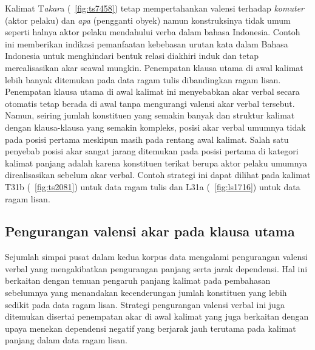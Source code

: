 Kalimat T\textit{akar}a (\pic~\ref{fig:ts7458}) tetap mempertahankan valensi terhadap \textit{komuter} (aktor pelaku) dan \textit{apa} (pengganti obyek) namun konstruksinya tidak umum seperti halnya aktor pelaku mendahului verba dalam bahasa Indonesia. Contoh ini memberikan indikasi pemanfaatan kebebasan urutan kata dalam Bahasa Indonesia untuk menghindari bentuk relasi diakhiri induk dan tetap merealisasikan akar seawal mungkin. Penempatan klausa utama di awal kalimat lebih banyak ditemukan pada data ragam tulis dibandingkan ragam lisan. Penempatan klausa utama di awal kalimat ini menyebabkan akar verbal secara otomatis tetap berada di awal tanpa mengurangi valensi akar verbal tersebut. Namun, seiring jumlah konstituen yang semakin banyak dan struktur kalimat dengan klausa-klausa yang semakin kompleks, posisi akar verbal umumnya tidak pada posisi pertama meskipun masih pada rentang awal kalimat. Salah satu penyebab posisi akar sangat jarang ditemukan pada posisi pertama di kategori kalimat panjang adalah karena konstituen terikat berupa aktor pelaku umumnya direalisasikan sebelum akar verbal. Contoh strategi ini dapat dilihat pada kalimat T31b (\pic~\ref{fig:ts2081}) untuk data ragam tulis dan L31a (\pic~\ref{fig:ls1716}) untuk data ragam lisan.

\subsection{Pengurangan valensi akar pada klausa utama}
Sejumlah simpai pusat dalam kedua korpus data mengalami pengurangan valensi verbal yang mengakibatkan pengurangan panjang serta jarak dependensi. Hal ini berkaitan dengan temuan pengaruh panjang kalimat pada pembahasan sebelumnya yang menandakan kecenderungan jumlah konstituen yang lebih sedikit pada data ragam lisan. Strategi pengurangan valensi verbal ini juga ditemukan disertai penempatan akar di awal kalimat yang juga berkaitan dengan upaya menekan dependensi negatif yang berjarak jauh terutama pada kalimat panjang dalam data ragam lisan.

